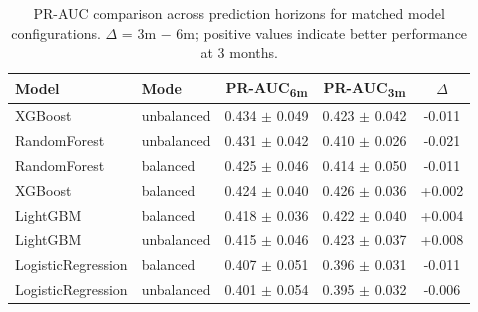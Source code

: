 \begin{table}[ht]
\centering
\caption{PR-AUC comparison across prediction horizons for matched model configurations. $\Delta$ = 3m $-$ 6m; positive values indicate better performance at 3 months.}
\label{tab:3m_vs_6m}
\small
\begin{tabular}{llccc}
\toprule
Model & Mode & PR-AUC\textsubscript{6m} & PR-AUC\textsubscript{3m} & $\Delta$ \\
\midrule
XGBoost & unbalanced & 0.434 $\pm$ 0.049 & 0.423 $\pm$ 0.042 & -0.011 \\
RandomForest & unbalanced & 0.431 $\pm$ 0.042 & 0.410 $\pm$ 0.026 & -0.021 \\
RandomForest & balanced & 0.425 $\pm$ 0.046 & 0.414 $\pm$ 0.050 & -0.011 \\
XGBoost & balanced & 0.424 $\pm$ 0.040 & 0.426 $\pm$ 0.036 & +0.002 \\
LightGBM & balanced & 0.418 $\pm$ 0.036 & 0.422 $\pm$ 0.040 & +0.004 \\
LightGBM & unbalanced & 0.415 $\pm$ 0.046 & 0.423 $\pm$ 0.037 & +0.008 \\
LogisticRegression & balanced & 0.407 $\pm$ 0.051 & 0.396 $\pm$ 0.031 & -0.011 \\
LogisticRegression & unbalanced & 0.401 $\pm$ 0.054 & 0.395 $\pm$ 0.032 & -0.006 \\
\bottomrule
\end{tabular}
\end{table}